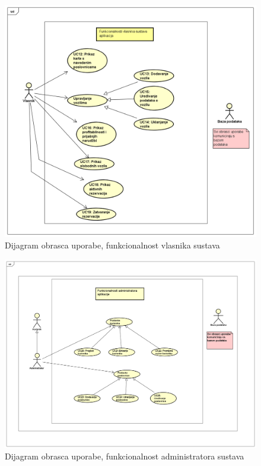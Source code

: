 				
				\begin{figure}[htb]
                    \centering
                    \includegraphics[width=15cm]{dokumentacija/slike/UseCaseDiagram1.png}
                    \caption{Dijagram obrasca uporabe, funkcionalnost vlasnika sustava}
                    \label{fig:useCase-1}
                \end{figure}
                \begin{figure}[htb]
                    \centering
                    \includegraphics[width=15cm]{dokumentacija/slike/UseCaseDiagram2.png}
                    \caption{Dijagram obrasca uporabe, funkcionalnost administratora sustava}
                    \label{fig:useCase-2}
                \end{figure}
                
